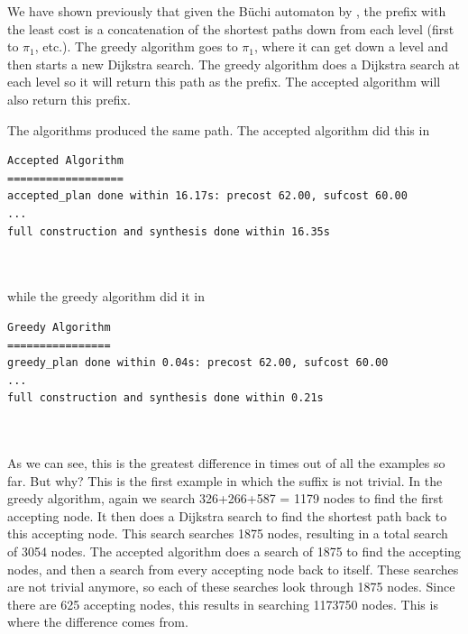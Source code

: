 We have shown previously that given the B\"{u}chi automaton by \cite{ltlbuchiwebsite}, the prefix with the least cost is a concatenation of the shortest paths down from each level (first to $\pi_1$, etc.). The greedy algorithm goes to $\pi_1$, where it can get down a level and then starts a new Dijkstra search. The greedy algorithm does a Dijkstra search at each level so it will return this path as the prefix. The accepted algorithm will also return this prefix. 

The algorithms produced the same path. The accepted algorithm did this in \\


\begin{minipage}{\textwidth}
\begingroup
\fontsize{9pt}{12pt}\selectfont
\begin{lstlisting}
Accepted Algorithm
==================
accepted_plan done within 16.17s: precost 62.00, sufcost 60.00
...
full construction and synthesis done within 16.35s 
\end{lstlisting}
\endgroup
\end{minipage} \\ \\


while the greedy algorithm did it in \\


\begin{minipage}{\textwidth}
\begingroup
\fontsize{9pt}{12pt}\selectfont
\begin{lstlisting}
Greedy Algorithm
================
greedy_plan done within 0.04s: precost 62.00, sufcost 60.00
...
full construction and synthesis done within 0.21s 
\end{lstlisting}
\endgroup
\end{minipage} \\ \\


As we can see, this is the greatest difference in times out of all the examples so far. But why? This is the first example in which the suffix is not trivial. In the greedy algorithm, again we search 326+266+587 = 1179 nodes to find the first accepting node. It then does a Dijkstra search to find the shortest path back to this accepting node. This search searches 1875 nodes, resulting in a total search of 3054 nodes. The accepted algorithm does a search of 1875 to find the accepting nodes, and then a search from every accepting node back to itself. These searches are not trivial anymore, so each of these searches look through 1875 nodes. Since there are 625 accepting nodes, this results in searching 1173750 nodes. This is where the difference comes from. 
